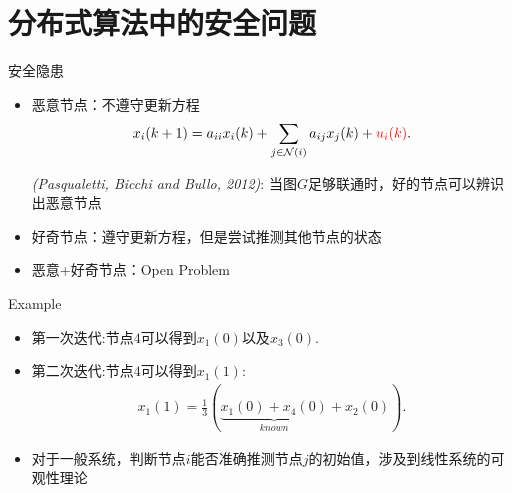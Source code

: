 \documentclass[10pt]{beamer}
\begin{document}
\section{分布式算法中的安全问题}
\begin{frame}{安全隐患}
  \begin{itemize}
  \item 恶意节点：不遵守更新方程 
    \begin{displaymath}
      x_i(k+1) = a_{ii} x_{i}(k) + \sum_{j\in \mathcal N(i)} a_{ij} x_{j}(k)+\textcolor{red}{u_i(k)}.
    \end{displaymath}

    \emph{(Pasqualetti, Bicchi and Bullo, 2012)}: 当图$G$足够联通时，好的节点可以辨识出恶意节点

  \item 好奇节点：遵守更新方程，但是尝试推测其他节点的状态
  \item 恶意+好奇节点：Open Problem 
  \end{itemize}
\end{frame}

\begin{frame}{Example}
  \begin{center}
  \end{center}
  \begin{itemize}
  \item 第一次迭代:节点$4$可以得到$x_1(0)$以及$x_3(0)$.
  \item 第二次迭代:节点$4$可以得到$x_1(1)$:
    \begin{align*}
      x_1(1) =\frac{1}{3}\left(\underbrace{x_1(0)+x_4(0)}_{known}+x_2(0)\right).
    \end{align*}
  \item 对于一般系统，判断节点$i$能否准确推测节点$j$的初始值，涉及到线性系统的可观性理论
  \end{itemize}
\end{frame}
\end{document}
